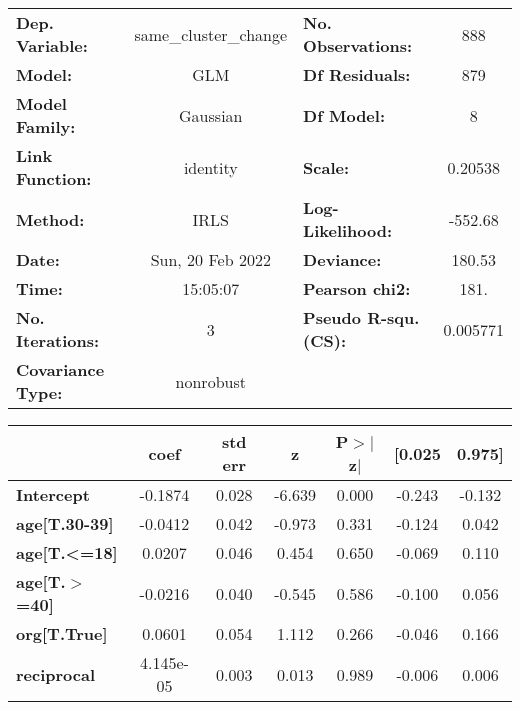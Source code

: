 \begin{center}
\begin{tabular}{lclc}
\toprule
\textbf{Dep. Variable:}   & same\_cluster\_change & \textbf{  No. Observations:  } &      888    \\
\textbf{Model:}           &          GLM          & \textbf{  Df Residuals:      } &      879    \\
\textbf{Model Family:}    &        Gaussian       & \textbf{  Df Model:          } &        8    \\
\textbf{Link Function:}   &        identity       & \textbf{  Scale:             } &   0.20538   \\
\textbf{Method:}          &          IRLS         & \textbf{  Log-Likelihood:    } &   -552.68   \\
\textbf{Date:}            &    Sun, 20 Feb 2022   & \textbf{  Deviance:          } &    180.53   \\
\textbf{Time:}            &        15:05:07       & \textbf{  Pearson chi2:      } &     181.    \\
\textbf{No. Iterations:}  &           3           & \textbf{  Pseudo R-squ. (CS):} &  0.005771   \\
\textbf{Covariance Type:} &       nonrobust       & \textbf{                     } &             \\
\bottomrule
\end{tabular}
\begin{tabular}{lcccccc}
                        & \textbf{coef} & \textbf{std err} & \textbf{z} & \textbf{P$> |$z$|$} & \textbf{[0.025} & \textbf{0.975]}  \\
\midrule
\textbf{Intercept}      &      -0.1874  &        0.028     &    -6.639  &         0.000        &       -0.243    &       -0.132     \\
\textbf{age[T.30-39]}   &      -0.0412  &        0.042     &    -0.973  &         0.331        &       -0.124    &        0.042     \\
\textbf{age[T.<=18]}    &       0.0207  &        0.046     &     0.454  &         0.650        &       -0.069    &        0.110     \\
\textbf{age[T.$>$=40]}  &      -0.0216  &        0.040     &    -0.545  &         0.586        &       -0.100    &        0.056     \\
\textbf{org[T.True]}    &       0.0601  &        0.054     &     1.112  &         0.266        &       -0.046    &        0.166     \\
\textbf{reciprocal}     &    4.145e-05  &        0.003     &     0.013  &         0.989        &       -0.006    &        0.006     \\

\end{tabular}
\end{center}
